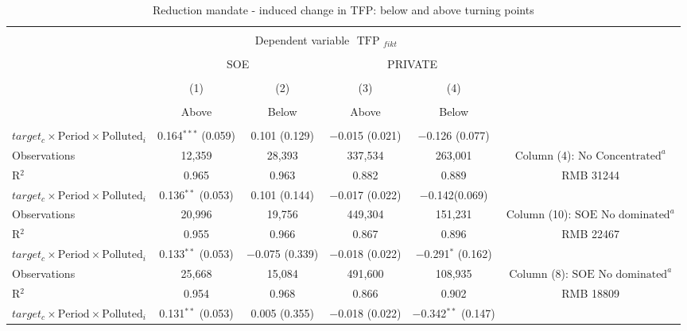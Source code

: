 \documentclass[12pt]{article}
\begin{document}
\begin{table}[!htb] \centering 
  \caption{\\ Reduction mandate - induced change in TFP: below and above turning points} 
\label{table_11}
\begin{adjustbox}{width=\textwidth, totalheight=\baselineskip,keepaspectratio}
\begin{tabular}{@{\extracolsep{5pt}}lccccc} 
\\[-1.8ex]\hline 
\hline \\[-1.8ex] 
 & \multicolumn{4}{c}{Dependent variable $\text { TFP }_{fikt}$} \\ 
\cline{2-6}
            
\\[-1.8ex]
            &\multicolumn{2}{c}{SOE}&\multicolumn{2}{c}{PRIVATE}\\
\\[-1.8ex] & (1) & (2) & (3) & (4) \\
 \\[-1.8ex]& Above & Below & Above & Below \\
 \hline \\[-1.8ex] 
$target_c \times \text{Period} \times \text{Polluted}_i$  &0.164$^{***}$ (0.059) & 0.101 (0.129) & $-$0.015 (0.021)& $-$0.126 (0.077) &  \\
Observations  & 12,359 & 28,393 & 337,534 & 263,001&  Column (4): $\text{No Concentrated}^a$\\
R$^{2}$  & 0.965 & 0.963 & 0.882 & 0.889&  RMB 31244\\
\hline 
$target_c \times \text{Period} \times \text{Polluted}_i$  &  0.136$^{**}$ (0.053) & 0.101 (0.144) & $-$0.017 (0.022) & $-$0.142(0.069)&  \\
Observations  & 20,996 & 19,756 & 449,304 & 151,231 &  Column (10): $\text{SOE No dominated}^a$ \\ 
R$^{2}$  &0.955 & 0.966 & 0.867 & 0.896&  RMB 22467\\
\hline 
$target_c \times \text{Period} \times \text{Polluted}_i$  & 0.133$^{**}$ (0.053) & $-$0.075 (0.339) & $-$0.018 (0.022)&  $-$0.291$^{*}$ (0.162)& \\
Observations  & 25,668 & 15,084 & 491,600 & 108,935 &  Column (8): $\text{SOE No dominated}^a$ \\ 
R$^{2}$  & 0.954 & 0.968 & 0.866 & 0.902&  RMB 18809\\
\hline 
$target_c \times \text{Period} \times \text{Polluted}_i$  & 
0.131$^{**}$ (0.053)& 0.005 (0.355)& $-$0.018  (0.022)& $-$0.342$^{**}$ (0.147) & \\

\end{tabular}
\end{adjustbox}
\end{table}
\end{document}
